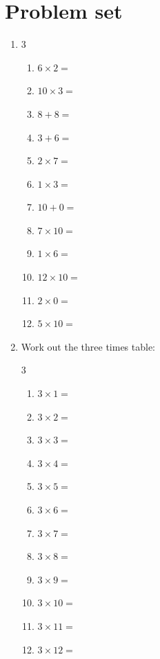 \documentclass{tufte-book}
\begin{document}
\clearpage\section{Problem set }
\begin{enumerate}
\item
\begin{multicols}{3}
\begin{enumerate}
      \item $6 \times 2=$ \dotfill\bigskip
      \item $10 \times 3=$ \dotfill\bigskip
      \item $8 + 8=$ \dotfill\bigskip
      \item $3 + 6=$ \dotfill
      \item $2 \times 7=$ \dotfill\bigskip
      \item $1 \times 3=$ \dotfill\bigskip
      \item $10 + 0=$ \dotfill\bigskip
      \item $7 \times 10=$ \dotfill
      \item $1 \times 6=$ \dotfill\bigskip
      \item $12 \times 10=$ \dotfill\bigskip
      \item $2 \times 0=$ \dotfill\bigskip
      \item $5 \times 10=$ \dotfill
\end{enumerate}
\end{multicols}

\item Work out the three times table:
\begin{multicols}{3}
\begin{enumerate}
  \item $3 \times 1=$ \dotfill\bigskip
  \item $3 \times 2=$ \dotfill\bigskip
  \item $3 \times 3=$ \dotfill\bigskip
  \item $3 \times 4=$ \dotfill
  \item $3 \times 5=$ \dotfill\bigskip
  \item $3 \times 6=$ \dotfill\bigskip
  \item $3 \times 7=$ \dotfill\bigskip
  \item $3 \times 8=$ \dotfill
  \item $3 \times 9=$ \dotfill\bigskip
  \item $3 \times 10=$ \dotfill\bigskip
  \item $3 \times 11=$ \dotfill\bigskip
  \item $3 \times 12=$ \dotfill
\end{enumerate}
\end{multicols}


\end{enumerate}
\end{document}
